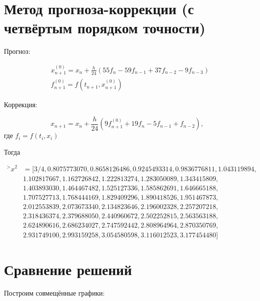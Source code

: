 \documentclass[14pt,a4paper]{scrartcl}
\begin{document}
\section*{Метод прогноза-коррекции (с четвёртым порядком точности)}

Прогноз:

\begin{equation*}
	\begin{aligned}
	&x_{n+1}^{(0)}=x_{n}+\frac{h}{24}\left(55 f_{n}-59 f_{n-1}+37 f_{n-2}-9 f_{n-3}\right)\\
	&f_{n+1}^{(0)}=f\left(t_{n+1}, x_{n+1}^{(0)}\right)
	\end{aligned}
\end{equation*}

Коррекция:

\begin{equation*}
	x_{n+1}=x_{n}+\frac{h}{24}\left(9 f_{n+1}^{(0)}+19 f_{n}-5 f_{n-1}+f_{n-2}\right),
\end{equation*}
где $f_i = f(t_i,x_i)$


Тогда

\begin{align*}
	^>x^2 &= [3/4, 0.8075773070, 0.8658126486, 0.9245493314, 0.9836776811,
	1.043119894, \\& 1.102817667, 1.162726842, 1.222813274, 1.283050089,
	1.343415809, \\& 1.403893030, 1.464467482, 1.525127336, 1.585862691,
	1.646665188, \\& 1.707527713, 1.768444169, 1.829409296, 1.890418526,
	1.951467873, \\& 2.012553839, 2.073673340, 2.134823646, 2.196002328,
	2.257207218, \\& 2.318436374, 2.379688050, 2.440960672, 2.502252815,
	2.563563188, \\& 2.624890616, 2.686234027, 2.747592442, 2.808964964,
	2.870350769, \\& 2.931749100, 2.993159258, 3.054580598, 3.116012523,
	3.177454480]
\end{align*}


\pagebreak
\section*{Сравнение решений}

Построим совмещённые графики:
\end{document}
